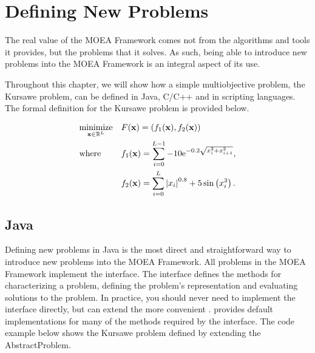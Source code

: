 \chapter{Defining New Problems}

The real value of the MOEA Framework comes not from the algorithms and tools it provides, but the problems that it solves.  As such, being able to introduce new problems into the MOEA Framework is an integral aspect of its use.

Throughout this chapter, we will show how a simple multiobjective problem, the Kursawe problem, can be defined in Java, C/C++ and in scripting languages.  The formal definition for the Kursawe problem is provided below.

\begin{equation}
  \label{eq:mop}
  \begin{aligned}
    & \underset{\mathbf{x} \in \mathbb{R}^L}{\text{minimize}}
      & & F(\mathbf{x}) = (f_1(\mathbf{x}), f_2(\mathbf{x})) \\
    & \text{where}
      & & f_1(\mathbf{x}) = \sum_{i=0}^{L-1} -10\text{e}^{-0.2\sqrt{x_i^2 + x_{i+1}^2}}, \\
    & & & f_2(\mathbf{x}) = \sum_{i=0}^{L} \left|x_i\right|^{0.8} + 5\sin\left(x_i^3\right).
  \end{aligned}
\end{equation}

\section{Java}
Defining new problems in Java is the most direct and straightforward way to introduce new problems into the MOEA Framework.  All problems in the MOEA Framework implement the  interface.  The  interface defines the methods for characterizing a problem, defining the problem's representation and evaluating solutions to the problem.  In practice, you should never need to implement the  interface directly, but can extend the more convenient .   provides default implementations for many of the methods required by the  interface.  The code example below shows the Kursawe problem defined by extending the AbstractProblem.

